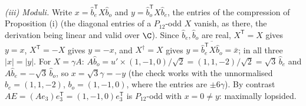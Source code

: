 \emph{(iii) Moduli.} Write $x = \hat{b}_{e}^{\mathsf T}X\hat{b}_{o}$ and $y = \hat{b}_{o}^{\mathsf T}X\hat{b}_{e}$, the entries of the compression of Proposition (i) (the diagonal entries of a $P_{12}$-odd $X$ vanish, as there, the derivation being linear and valid over $\C$). Since $\hat{b}_{e}, \hat{b}_{o}$ are real, $X^{\mathsf T} = X$ gives $y = x$, $X^{\mathsf T} = -X$ gives $y = -x$, and $X^{\dagger} = X$ gives $y = \overline{\hat{b}_{e}^{\mathsf T}X\hat{b}_{o}} = \bar{x}$; in all three $|x| = |y|$. For $X = \gamma A$: $A\hat{b}_{o} = u'\times(1,-1,0)/\sqrt2 = (1,1,-2)/\sqrt2 = \sqrt3\,\hat{b}_{e}$ and $A\hat{b}_{e} = -\sqrt3\,\hat{b}_{o}$, so $x = \sqrt3\gamma = -y$ (the check works with the unnormalised $b_{e} = (1,1,-2)$, $b_{o} = (1,-1,0)$, where the entries are $\pm 6\gamma$). By contrast $AE = (Ae_{3})e_{3}^{\mathsf T} = (1,-1,0)e_{3}^{\mathsf T}$ is $P_{12}$-odd with $x = 0 \ne y$: maximally lopsided.

